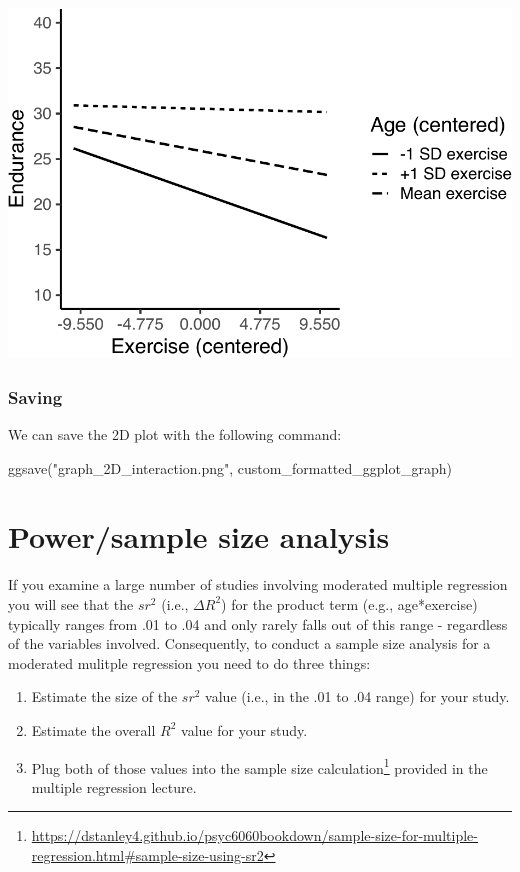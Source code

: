 \documentclass[
]{krantz}
\makeatletter
\newenvironment{Shaded}{\begin{snugshade}}{\end{snugshade}}
\newcommand{\FunctionTok}[1]{\textcolor[rgb]{0,0,0}{#1}}
\newcommand{\NormalTok}[1]{#1}
\newcommand{\StringTok}[1]{\textcolor[rgb]{0.5,0.5,0.5}{#1}}
\renewcommand{\href}[2]{#2\footnote{\url{#1}}}
\newenvironment{kframe}{%
\medskip{}
\setlength{\fboxsep}{.8em}
 \def\at@end@of@kframe{}%
 \ifinner\ifhmode%
  \def\at@end@of@kframe{\end{minipage}}%
  \begin{minipage}{\columnwidth}%
 \fi\fi%
 \def\FrameCommand##1{\hskip\@totalleftmargin \hskip-\fboxsep
 \colorbox{shadecolor}{##1}\hskip-\fboxsep
     \hskip-\linewidth \hskip-\@totalleftmargin \hskip\columnwidth}%
 \MakeFramed {\advance\hsize-\width
   \@totalleftmargin\z@ \linewidth\hsize
   \@setminipage}}%
 {\par\unskip\endMakeFramed%
 \at@end@of@kframe}
\renewenvironment{Shaded}{\begin{kframe}}{\end{kframe}}
\makeatother
\begin{document}
\includegraphics{bookdown_files/figure-latex/unnamed-chunk-508-1.pdf}

\hypertarget{saving-1}{%
\subsubsection{Saving}\label{saving-1}}

We can save the 2D plot with the following command:

\begin{Shaded}
\begin{Highlighting}[]
\FunctionTok{ggsave}\NormalTok{(}\StringTok{"graph\_2D\_interaction.png"}\NormalTok{, custom\_formatted\_ggplot\_graph)}
\end{Highlighting}
\end{Shaded}

\hypertarget{powersample-size-analysis}{%
\section{Power/sample size analysis}\label{powersample-size-analysis}}

If you examine a large number of studies involving moderated multiple regression you will see that the \(sr^2\) (i.e., \(\Delta R^2\)) for the product term (e.g., age*exercise) typically ranges from .01 to .04 and only rarely falls out of this range - regardless of the variables involved. Consequently, to conduct a sample size analysis for a moderated mulitple regression you need to do three things:

\begin{enumerate}
\def\labelenumi{\arabic{enumi}.}
\item
  Estimate the size of the \(sr^2\) value (i.e., in the .01 to .04 range) for your study.
\item
  Estimate the overall \(R^2\) value for your study.
\item
  Plug both of those values into the \href{https://dstanley4.github.io/psyc6060bookdown/sample-size-for-multiple-regression.html\#sample-size-using-sr2}{sample size calculation} provided in the multiple regression lecture.
\end{enumerate}
\end{document}
